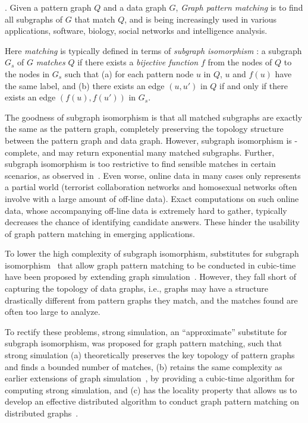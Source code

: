 . Given a pattern graph $Q$ and a data graph $G$,
{\em Graph pattern matching} is to find all subgraphs of $G$ that match $Q$, and is being increasingly used in various applications, \eg software, biology, social networks and intelligence analysis.


Here {\em matching} is typically defined in terms of
{\em subgraph isomorphism} \cite{Galla06}:
a subgraph $G_s$ of $G$ {\em matches} $Q$ if
there exists a {\em bijective function} $f$
from the nodes of $Q$ to the nodes in $G_s$ such that (a)  for each
pattern node $u$ in $Q$, $u$ and $f(u)$
have the same label,
and (b) there exists an edge $(u, u')$ in $Q$ if and only
if there exists an edge $(f(u), f(u'))$ in $G_s$.


The goodness of subgraph isomorphism is that all matched subgraphs  are exactly the same as the pattern graph, \ie completely preserving the  topology structure between the pattern graph and data graph. However, subgraph isomorphism is \NP-complete, and may return exponential many matched subgraphs.
Further, subgraph isomorphism is too restrictive to find sensible matches in certain scenarios, as observed in~\cite{FanLMTWW10}. Even worse, online data in many cases only represents a partial world (\eg terrorist collaboration networks and homosexual networks often involve with a large amount of off-line data).
Exact computations on such online data, whose accompanying off-line data is extremely hard to gather, typically decreases the chance of identifying candidate answers.
These hinder the usability of graph pattern matching in emerging applications.


To lower the high complexity of subgraph isomorphism, substitutes for subgraph isomorphism~\cite{FanLMTWW10,FanLMTW11} that allow graph pattern matching to be conducted in cubic-time have been proposed by extending graph simulation~\cite{infsimu95}. However, they fall short of capturing the topology of data graphs, i.e., graphs may have a structure drastically different from pattern graphs they match, and the matches found are often too large to analyze.

To rectify these problems, strong simulation, an ``approximate'' substitute for subgraph isomorphism, was  proposed for graph pattern matching, such that strong simulation (a) theoretically preserves the key topology of pattern graphs and finds a bounded number of matches, (b) retains the same complexity as earlier extensions of graph simulation~\cite{FanLMTWW10,FanLMTW11}, by providing a cubic-time algorithm for computing strong simulation, and (c) has the locality property that allows us to develop an effective distributed algorithm to conduct graph pattern matching on distributed graphs~\cite{tods-MaCFHW14}.

